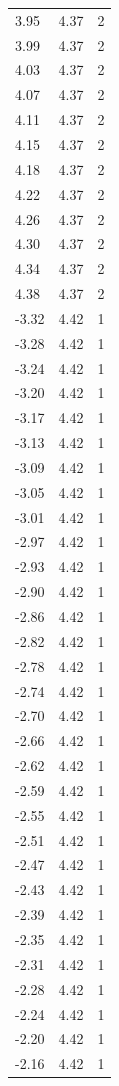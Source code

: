 \begin{longtable}{lrr}
  3.95 & 4.37 & 2 \\
  3.99 & 4.37 & 2 \\
  4.03 & 4.37 & 2 \\
  4.07 & 4.37 & 2 \\
  4.11 & 4.37 & 2 \\
  4.15 & 4.37 & 2 \\
  4.18 & 4.37 & 2 \\
  4.22 & 4.37 & 2 \\
  4.26 & 4.37 & 2 \\
  4.30 & 4.37 & 2 \\
  4.34 & 4.37 & 2 \\
  4.38 & 4.37 & 2 \\
  -3.32 & 4.42 & 1 \\
  -3.28 & 4.42 & 1 \\
  -3.24 & 4.42 & 1 \\
  -3.20 & 4.42 & 1 \\
  -3.17 & 4.42 & 1 \\
  -3.13 & 4.42 & 1 \\
  -3.09 & 4.42 & 1 \\
  -3.05 & 4.42 & 1 \\
  -3.01 & 4.42 & 1 \\
  -2.97 & 4.42 & 1 \\
  -2.93 & 4.42 & 1 \\
  -2.90 & 4.42 & 1 \\
  -2.86 & 4.42 & 1 \\
  -2.82 & 4.42 & 1 \\
  -2.78 & 4.42 & 1 \\
  -2.74 & 4.42 & 1 \\
  -2.70 & 4.42 & 1 \\
  -2.66 & 4.42 & 1 \\
  -2.62 & 4.42 & 1 \\
  -2.59 & 4.42 & 1 \\
  -2.55 & 4.42 & 1 \\
  -2.51 & 4.42 & 1 \\
  -2.47 & 4.42 & 1 \\
  -2.43 & 4.42 & 1 \\
  -2.39 & 4.42 & 1 \\
  -2.35 & 4.42 & 1 \\
  -2.31 & 4.42 & 1 \\
  -2.28 & 4.42 & 1 \\
  -2.24 & 4.42 & 1 \\
  -2.20 & 4.42 & 1 \\
  -2.16 & 4.42 & 1 \\

\end{longtable}
